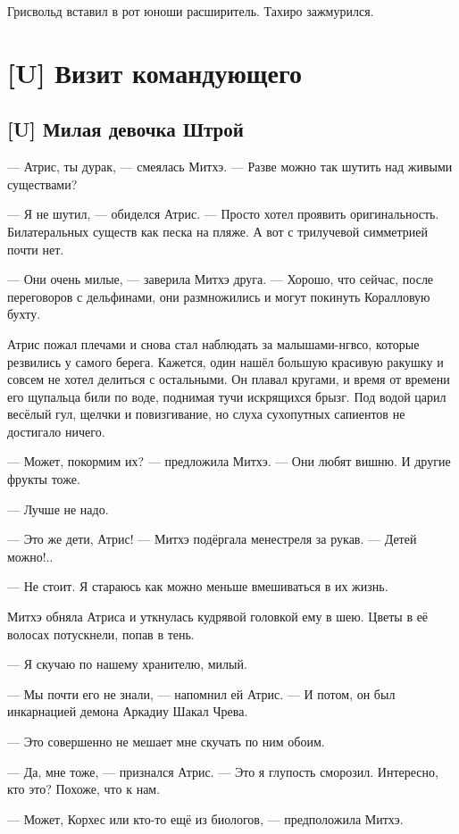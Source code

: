 Грисвольд вставил в рот юноши расширитель.
Тахиро зажмурился.

\chapter{[U] Визит командующего}

\section{[U] Милая девочка Штрой}

--- Атрис, ты дурак, --- смеялась Митхэ.
--- Разве можно так шутить над живыми существами?

--- Я не шутил, --- обиделся Атрис.
--- Просто хотел проявить оригинальность.
Билатеральных существ как песка на пляже.
А вот с трилучевой симметрией почти нет.

--- Они очень милые, --- заверила Митхэ друга.
--- Хорошо, что сейчас, после переговоров с дельфинами, они размножились и могут покинуть Коралловую бухту.

Атрис пожал плечами и снова стал наблюдать за малышами-нгвсо, которые резвились у самого берега.
Кажется, один нашёл большую красивую ракушку и совсем не хотел делиться с остальными.
Он плавал кругами, и время от времени его щупальца били по воде, поднимая тучи искрящихся брызг.
Под водой царил весёлый гул, щелчки и повизгивание, но слуха сухопутных сапиентов не достигало ничего.

--- Может, покормим их? --- предложила Митхэ.
--- Они любят вишню.
И другие фрукты тоже.

--- Лучше не надо.

--- Это же дети, Атрис! --- Митхэ подёргала менестреля за рукав.
--- Детей можно!..

--- Не стоит.
Я стараюсь как можно меньше вмешиваться в их жизнь.

Митхэ обняла Атриса и уткнулась кудрявой головкой ему в шею.
Цветы в её волосах потускнели, попав в тень.

--- Я скучаю по нашему хранителю, милый.

--- Мы почти его не знали, --- напомнил ей Атрис.
--- И потом, он был инкарнацией демона Аркадиу Шакал Чрева.

--- Это совершенно не мешает мне скучать по ним обоим.

--- Да, мне тоже, --- признался Атрис.
--- Это я глупость сморозил.
Интересно, кто это?
Похоже, что к нам.

--- Может, Корхес или кто-то ещё из биологов, --- предположила Митхэ.

